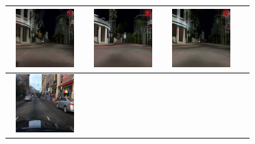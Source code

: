 \documentclass{VUMIFPSbakalaurinis}
\begin{document}
\begin{table}[H]
{\begin{tabular}{|c|c|c|c|}
            \includegraphics[width=100,height=85]{img/pvz/5_cycle} & \includegraphics[width=100,height=85]{img/pvz/5_cut} & \includegraphics[width=100,height=85]{img/pvz/5_mspc}
            \\
            \hline
            \includegraphics[width=100,height=85]{img/pvz/6_real} & 

\end{tabular}}
\end{table}
\end{document}
